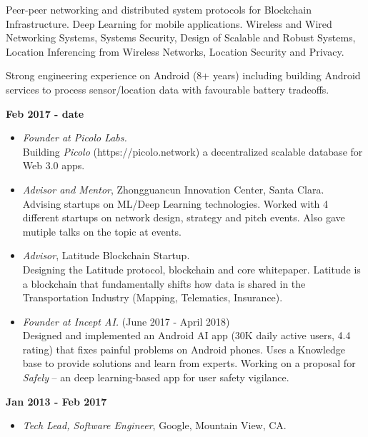 

\begin{resume}
 
Peer-peer networking and distributed system protocols for Blockchain Infrastructure.
Deep Learning for mobile applications.
Wireless and Wired Networking Systems, Systems Security, Design of Scalable and Robust
Systems, Location Inferencing from Wireless Networks, Location Security and Privacy.

Strong engineering experience on Android (8+ years) including building Android services to process sensor/location data
with favourable battery tradeoffs.

{\bf Feb 2017 - date}
    \begin{itemize}
        \item [] {\it Founder at Picolo Labs.} \\ 
            Building {\em Picolo} (https://picolo.network) a decentralized scalable database for Web 3.0 apps.
        \item [] {\it Advisor and Mentor}, Zhongguancun Innovation Center, Santa Clara. \\
            Advising startups on ML/Deep Learning technologies. Worked with 4 different startups on network design,
            strategy and pitch events. Also gave mutiple talks on the topic at events.
        \item [] {\it Advisor}, Latitude Blockchain Startup. \\ 
            Designing the Latitude protocol, blockchain and core
            whitepaper. Latitude is a blockchain that fundamentally shifts how data is shared in the Transportation
            Industry (Mapping, Telematics, Insurance).
        \item [] {\it Founder at Incept AI.} (June 2017 - April 2018) \\
            Designed and implemented an Android AI app (30K daily active users, 4.4 rating) that fixes painful problems
            on Android phones. Uses a Knowledge base to provide solutions and learn from experts.
            Working on a proposal for {\em Safely} -- an deep learning-based app for user safety vigilance.
    \end{itemize}
{\bf Jan 2013 - Feb 2017}
    \begin{itemize}
         \item[] {\it Tech Lead, Software Engineer}, Google, Mountain View, CA.\\


\end{itemize}
\end{resume}
